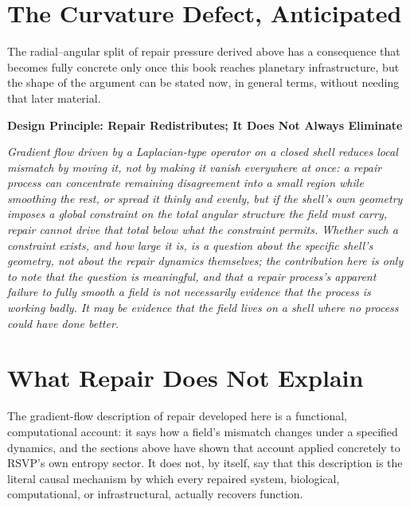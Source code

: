 \documentclass[11pt,fleqn]{book}
\numberwithin{equation}{chapter}
\newenvironment{principle}[1]
  {\begin{principleEnv}
   \noindent\textbf{Design Principle: #1}\par\smallskip\itshape}
  {\end{principleEnv}}
\theoremstyle{plain}
\theoremstyle{definition}
\theoremstyle{remark}
\begin{document}
\section{The Curvature Defect, Anticipated}

The radial--angular split of repair pressure derived above has a consequence that becomes fully concrete only once this book reaches planetary infrastructure, but the shape of the argument can be stated now, in general terms, without needing that later material.

\begin{principle}{Repair Redistributes; It Does Not Always Eliminate}
Gradient flow driven by a Laplacian-type operator on a closed shell reduces local mismatch by moving it, not by making it vanish everywhere at once: a repair process can concentrate remaining disagreement into a small region while smoothing the rest, or spread it thinly and evenly, but if the shell's own geometry imposes a global constraint on the total angular structure the field must carry, repair cannot drive that total below what the constraint permits. Whether such a constraint exists, and how large it is, is a question about the specific shell's geometry, not about the repair dynamics themselves; the contribution here is only to note that the question is meaningful, and that a repair process's apparent failure to fully smooth a field is not necessarily evidence that the process is working badly. It may be evidence that the field lives on a shell where no process could have done better.
\end{principle}

\section{What Repair Does Not Explain}

The gradient-flow description of repair developed here is a functional, computational account: it says how a field's mismatch changes under a specified dynamics, and the sections above have shown that account applied concretely to RSVP's own entropy sector. It does not, by itself, say that this description is the literal causal mechanism by which every repaired system, biological, computational, or infrastructural, actually recovers function.
\end{document}
